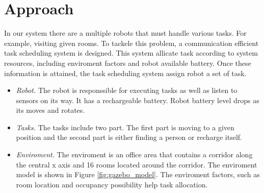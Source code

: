 \chapter{Approach}


In our system there are a multiple robots that must handle various tasks. For example, visiting given rooms. To tackele this problem, a communication efficient task scheduling system is designed. 
This system allicate task according to system resources, including enviroment factors and robot available battery. Once these information is attained, the task scheduling system assign robot a set of task.
\begin{itemize}
	\item \textsl{Robot.} The robot is responssible for executing tasks as well as listen to sensors on its way. It has a rechargeable battery. Robot battery level drops as its moves and rotates.
	\item \textsl{Tasks.} The tasks include two part. The first part is moving to a given position and the second part is either finding a person or recharge itself.
	\item \textsl{Enviroment.} The enviroment is an office area that contains a corridor along the central x axis and 16 rooms located around the corridor. The enviroment model is shown in Figure \ref{fig:gazebo_model}. The enviroment factors, such as room location and occupancy possibility help task allocation.
\end{itemize}

